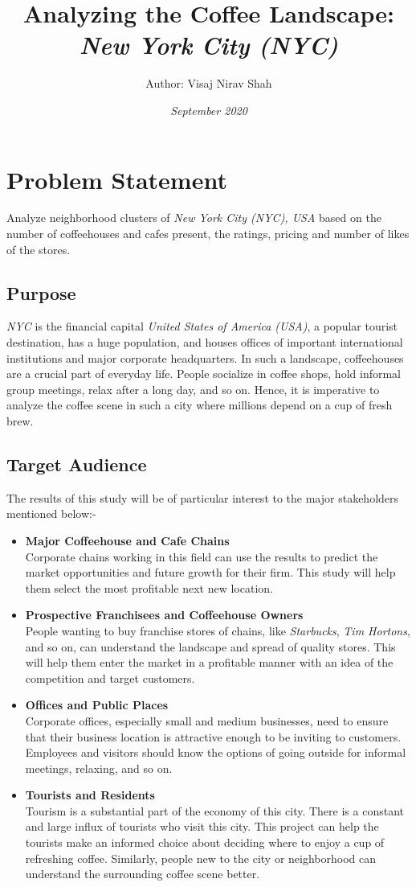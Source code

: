 \documentclass{article}
\title{\textbf{Analyzing the Coffee Landscape: \\\textit{New York City (NYC)}}}
\author{Author: Visaj Nirav Shah}
\date{\emph{September 2020}}
\begin{document}
\maketitle

\section{Problem Statement}
{Analyze neighborhood clusters of \textit{New York City (NYC), USA} based on the number of coffeehouses and cafes present, the ratings, pricing and number of likes of the stores.}
\subsection{Purpose}
{\textit{NYC} is the financial capital \textit{United States of America (USA)}, a popular tourist destination, has a huge population, and houses offices of important international institutions and major corporate headquarters. In such a landscape, coffeehouses are a crucial part of everyday life. People socialize in coffee shops, hold informal group meetings, relax after a long day, and so on. Hence, it is imperative to analyze the coffee scene in such a city where millions depend on a cup of fresh brew.}
\subsection{Target Audience}
{The results of this study will be of particular interest to the major stakeholders mentioned below:-}
\begin{itemize}
    \item \textbf{Major Coffeehouse and Cafe Chains}\\{Corporate chains working in this field can use the results to predict the market opportunities and future growth for their firm. This study will help them select the most profitable next new location.}
    \item \textbf{Prospective Franchisees and Coffeehouse Owners}\\{People wanting to buy franchise stores of chains, like \textit{Starbucks}, \textit{Tim Hortons}, and so on, can understand the landscape and spread of quality stores. This will help them enter the market in a profitable manner with an idea of the competition and target customers.}
    \pagebreak
    \item \textbf{Offices and Public Places}\\{Corporate offices, especially small and medium businesses, need to ensure that their business location is attractive enough to be inviting to customers. Employees and visitors should know the options of going outside for informal meetings, relaxing, and so on.}
    \item \textbf{Tourists and Residents}\\{Tourism is a substantial part of the economy of this city. There is a constant and large influx of tourists who visit this city. This project can help the tourists make an informed choice about deciding where to enjoy a cup of refreshing coffee. Similarly, people new to the city or neighborhood can understand the surrounding coffee scene better.}
\end{itemize}
\end{document}
